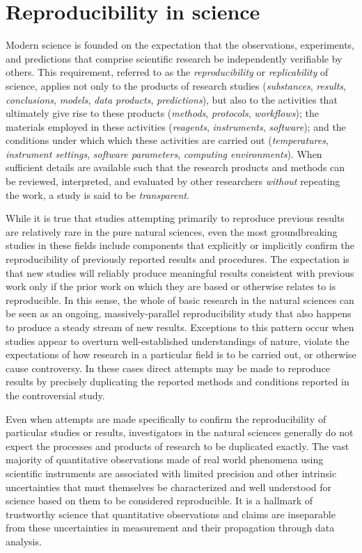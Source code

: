 \section{Reproducibility in science}

Modern science is founded on the expectation that the observations, experiments, and
	predictions that comprise scientific research be independently verifiable by others.
This requirement, referred to as the \emph{reproducibility} or \emph{replicability} of 
	science, applies not only to the products of research studies (\emph{substances}, 
	\emph{results}, \emph{conclusions}, \emph{models}, \emph{data products}, 
	\emph{predictions}), but also to the activities that ultimately give rise to these
	products (\emph{methods}, \emph{protocols}, \emph{workflows}); the materials 
	employed in these activities (\emph{reagents}, \emph{instruments}, 
	\emph{software}); and the conditions 
	under which which these activities are carried out (\emph{temperatures},
	\emph{instrument settings}, \emph{software parameters},
	\emph{computing environments}).  When sufficient details are available
	such that the research products and methods can be reviewed, interpreted, and
	evaluated by other researchers \emph{without} repeating the work, a study is said to be 
	\emph{transparent}.

While it is true that studies attempting primarily to reproduce previous results are relatively rare in the
	pure natural sciences, even the most groundbreaking studies in these fields include components	
	that explicitly or implicitly confirm the reproducibility of previously reported results and procedures.
The expectation is that new studies will reliably produce meaningful results consistent with previous work 
	only if the prior work on which they are based or otherwise relates to is reproducible.
In this sense, the whole of basic research in the natural sciences can be seen as an ongoing, massively-parallel
	reproducibility study that also happens to produce a steady stream of new results.
Exceptions to this pattern occur when studies appear to overturn well-established understandings of nature,
	violate the expectations of how research in a particular field is to be carried out, or otherwise cause controversy.
In these cases direct attempts may be made to reproduce results by precisely duplicating the reported methods
	and conditions reported in the controversial study.

Even when attempts are made specifically to confirm the reproducibility of particular studies or results, investigators in
	the natural sciences generally do not expect the processes and products of research to be duplicated exactly.
The vast majority of quantitative observations made of real world phenomena using scientific instruments
	are associated with limited precision and other intrinsic uncertainties that must themselves be characterized
	and well understood for science based on them to be considered reproducible.
It is a hallmark of trustworthy science that quantitative observations and claims are inseparable from these 
	uncertainties in measurement and their propagation through data analysis.

